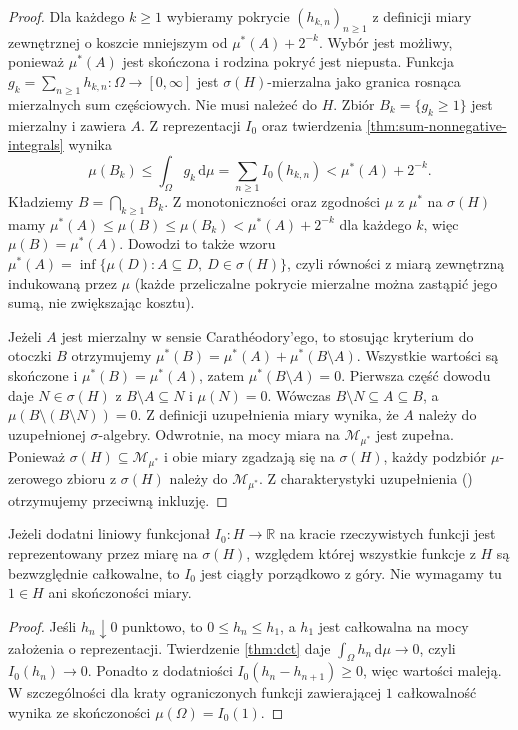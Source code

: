 \begin{proof}
Dla każdego $k\ge1$ wybieramy pokrycie
$(h_{k,n})_{n\ge1}$ z definicji miary zewnętrznej
o koszcie mniejszym od $\mu^*(A)+2^{-k}$.
Wybór jest możliwy, ponieważ $\mu^*(A)$ jest
skończona i rodzina pokryć jest niepusta.
Funkcja
$g_k=\sum_{n\ge1}h_{k,n}:\Omega\to[0,\infty]$
jest $\sigma(H)$-mierzalna jako granica rosnąca
mierzalnych sum częściowych. Nie musi należeć do $H$.
Zbiór $B_k=\{g_k\ge1\}$ jest mierzalny i zawiera $A$.
Z reprezentacji $I_0$ oraz twierdzenia
\ref{thm:sum-nonnegative-integrals} wynika
\[
 \mu(B_k)\le \int_\Omega g_k\,\mathrm d\mu
 =\sum_{n\ge1}I_0(h_{k,n})<\mu^*(A)+2^{-k}.
\]
Kładziemy $B=\bigcap_{k\ge1}B_k$.
Z monotoniczności oraz zgodności $\mu$ z $\mu^*$
na $\sigma(H)$ mamy
$\mu^*(A)\le\mu(B)\le\mu(B_k)<\mu^*(A)+2^{-k}$
dla każdego $k$, więc $\mu(B)=\mu^*(A)$.
Dowodzi to także wzoru
$\mu^*(A)=\inf\{\mu(D):A\subseteq D,\ D\in\sigma(H)\}$,
czyli równości z miarą zewnętrzną indukowaną przez
$\mu$ (każde przeliczalne pokrycie mierzalne można
zastąpić jego sumą, nie zwiększając kosztu).

Jeżeli $A$ jest mierzalny w sensie Carathéodory'ego,
to stosując kryterium do otoczki $B$ otrzymujemy
$\mu^*(B)=\mu^*(A)+\mu^*(B\setminus A)$.
Wszystkie wartości są skończone i
$\mu^*(B)=\mu^*(A)$, zatem $\mu^*(B\setminus A)=0$.
Pierwsza część dowodu daje $N\in\sigma(H)$
z $B\setminus A\subseteq N$ i $\mu(N)=0$.
Wówczas $B\setminus N\subseteq A\subseteq B$,
a $\mu(B\setminus(B\setminus N))=0$.
Z definicji uzupełnienia miary wynika, że $A$
należy do uzupełnionej $\sigma$-algebry.
Odwrotnie, na mocy
miara na $\mathcal M_{\mu^*}$ jest zupełna.
Ponieważ $\sigma(H)\subseteq\mathcal M_{\mu^*}$
i obie miary zgadzają się na $\sigma(H)$,
każdy podzbiór $\mu$-zerowego zbioru z $\sigma(H)$
należy do $\mathcal M_{\mu^*}$.
Z charakterystyki uzupełnienia
()
otrzymujemy przeciwną inkluzję.
\end{proof}

\begin{wniosek}\label{it:cor:daniell-necessity}
Jeżeli dodatni liniowy funkcjonał $I_0:H\to\mathbb{R}$ na kracie
rzeczywistych funkcji jest reprezentowany przez miarę
na $\sigma(H)$, względem której wszystkie funkcje z $H$
są bezwzględnie całkowalne, to $I_0$ jest ciągły
porządkowo z góry. Nie wymagamy tu $1\in H$ ani
skończoności miary.
\end{wniosek}
\begin{proof}
Jeśli $h_n\downarrow0$ punktowo, to $0\le h_n\le h_1$,
a $h_1$ jest całkowalna na mocy założenia o reprezentacji.
Twierdzenie \ref{thm:dct} daje $\int_\Omega h_n\,\mathrm d\mu\to0$,
czyli $I_0(h_n)\to0$. Ponadto z dodatniości
$I_0(h_n-h_{n+1})\ge0$, więc wartości maleją.
W szczególności dla kraty ograniczonych funkcji
zawierającej $1$ całkowalność wynika ze skończoności
$\mu(\Omega)=I_0(1)$.
\end{proof}

